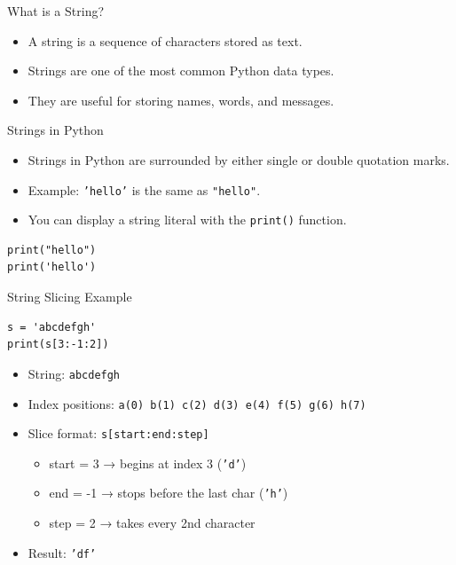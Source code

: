 \documentclass[aspectratio=169]{beamer}
\begin{document}
\begin{frame}[fragile]{What is a String?}
\begin{itemize}
  \item A string is a sequence of characters stored as text.
  \item Strings are one of the most common Python data types.
  \item They are useful for storing names, words, and messages.
 \end{itemize}
\end{frame}

\begin{frame}[fragile]{Strings in Python}
\begin{itemize}
  \item Strings in Python are surrounded by either single or double quotation marks.
  \item Example: \texttt{'hello'} is the same as \texttt{"hello"}.
  \item You can display a string literal with the \texttt{print()} function.
\end{itemize}

\begin{verbatim}
print("hello")
print('hello')
\end{verbatim}

\end{frame}

\begin{frame}[fragile]{String Slicing Example}
\begin{verbatim}
s = 'abcdefgh'
print(s[3:-1:2])   
\end{verbatim}

\begin{itemize}
  \item String: \texttt{abcdefgh}
  \item Index positions: \texttt{a(0) b(1) c(2) d(3) e(4) f(5) g(6) h(7)}
  \item Slice format: \texttt{s[start:end:step]}
  \begin{itemize}
    \item start = 3 → begins at index 3 (\texttt{'d'})
    \item end = -1 → stops before the last char (\texttt{'h'})
    \item step = 2 → takes every 2nd character
  \end{itemize}
  \item Result: \texttt{'df'}
\end{itemize}
\end{frame}
\end{document}
